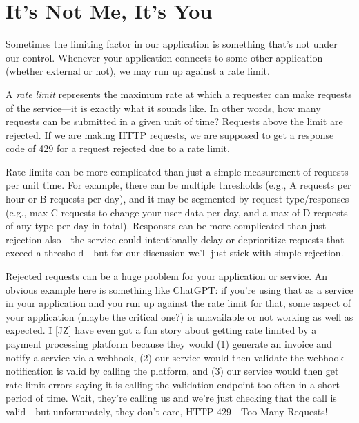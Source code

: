 




\section*{It's Not Me, It's You}

Sometimes the limiting factor in our application is something that's not under our control. Whenever your application connects to some other application (whether external or not), we may run up against a rate limit.

A \emph{rate limit} represents the maximum rate at which a requester can make requests of the service---it is exactly what it sounds like. In other words, how many requests can be submitted in a given unit of time? Requests above the limit are rejected. If we are making HTTP requests, we are supposed to get a response code of 429 for a request rejected due to a rate limit.

Rate limits can be more complicated than just a simple measurement of requests per unit time. For example, there can be multiple thresholds (e.g., A requests per hour or B requests per day), and it may be segmented by request type/responses (e.g., max C requests to change your user data per day, and a max of D requests of any type per day in total). Responses can be more complicated than just rejection also---the service could intentionally delay or deprioritize requests that exceed a threshold---but for our discussion we'll just stick with simple rejection.

Rejected requests can be a huge problem for your application or service. An obvious example here is something like ChatGPT: if you're using that as a service in your application and you run up against the rate limit for that, some aspect of your application (maybe the critical one?) is unavailable or not working as well as expected. I [JZ] have even got a fun story about getting rate limited by a payment processing platform because they would (1) generate an invoice and notify a service via a webhook, (2) our service would then validate the webhook notification is valid by calling the platform, and (3) our service would then get rate limit errors saying it is calling the validation endpoint too often in a short period of time. Wait, they're calling us and we're just checking that the call is valid---but unfortunately, they don't care, HTTP 429---Too Many Requests! 

